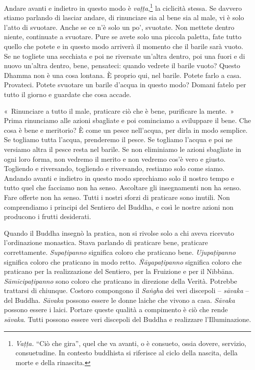 Andare avanti e indietro in questo modo è \emph{vaṭṭa},\footnote{\emph{Vaṭṭa.}
  ``Ciò che gira'', quel che va avanti, o è consueto, ossia dovere,
  servizio, consuetudine. In contesto buddhista si riferisce al ciclo
  della nascita, della morte e della rinascita.} la ciclicità stessa. Se
davvero stiamo parlando di lasciar andare, di rinunciare sia al bene sia
al male, vi è solo l'atto di svuotare. Anche se ce n'è solo un po',
svuotate. Non mettete dentro niente, continuate a svuotare. Pure se
avete solo una piccola paletta, fate tutto quello che potete e in questo
modo arriverà il momento che il barile sarà vuoto. Se ne togliete una
secchiata e poi ne riversate un'altra dentro, poi una fuori e di nuovo
un'altra dentro, bene, pensateci: quando vedrete il barile vuoto? Questo
Dhamma non è una cosa lontana. È proprio qui, nel barile. Potete farlo a
casa. Provateci. Potete svuotare un barile d'acqua in questo modo?
Domani fatelo per tutto il giorno e guardate che cosa accade.

«~Rinunciare a tutto il male, praticare ciò che è bene, purificare la
mente.~» Prima rinunciamo alle azioni sbagliate e poi cominciamo a
sviluppare il bene. Che cosa è bene e meritorio? È come un pesce
nell'acqua, per dirla in modo semplice. Se togliamo tutta l'acqua,
prenderemo il pesce. Se togliamo l'acqua e poi ne versiamo altra il
pesce resta nel barile. Se non eliminiamo le azioni sbagliate in ogni
loro forma, non vedremo il merito e non vedremo cos'è vero e giusto.
Togliendo e riversando, togliendo e riversando, restiamo solo come
siamo. Andando avanti e indietro in questo modo sprechiamo solo il
nostro tempo e tutto quel che facciamo non ha senso. Ascoltare gli
insegnamenti non ha senso. Fare offerte non ha senso. Tutti i nostri
sforzi di praticare sono inutili. Non comprendiamo i principi del
Sentiero del Buddha, e così le nostre azioni non producono i frutti
desiderati.

Quando il Buddha insegnò la pratica, non si rivolse solo a chi aveva
ricevuto l'ordinazione monastica. Stava parlando di praticare bene,
praticare correttamente. \emph{Supaṭipanno} significa coloro che
praticano bene. \emph{Ujupaṭipanno} significa coloro che praticano in
modo retto. \emph{Ñāyapaṭipanno} significa coloro che praticano per la
realizzazione del Sentiero, per la Fruizione e per il Nibbāna.
\emph{Sāmīcipaṭipanno} sono coloro che praticano in direzione della
Verità. Potrebbe trattarsi di chiunque. Costoro compongono il
\emph{Saṅgha} dei veri discepoli -- \emph{sāvaka} -- del Buddha.
\emph{Sāvaka} possono essere le donne laiche che vivono a casa.
\emph{Sāvaka} possono essere i laici. Portare queste qualità a
compimento è ciò che rende \emph{sāvaka}. Tutti possono essere veri
discepoli del Buddha e realizzare l'Illuminazione.

